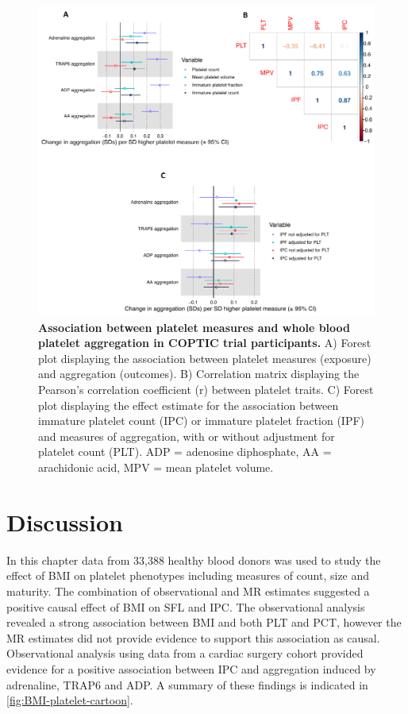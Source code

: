 \documentclass[11pt,twoside]{bristolthesis}
\begin{document}
\begin{figure}

{\centering \includegraphics[width=0.85\linewidth]{figure/BMI_platelets/IPC_aggregation} 

}

\caption[Association between platelet measures and whole blood platelet aggregation in COPTIC trial participants]{\textbf{Association between platelet measures and whole blood platelet aggregation in COPTIC trial participants.} A) Forest plot displaying the association between platelet measures (exposure) and aggregation (outcomes). B) Correlation matrix displaying the Pearson's correlation coefficient (r) between platelet traits. C) Forest plot displaying the effect estimate for the association between immature platelet count (IPC) or immature platelet fraction (IPF) and measures of aggregation, with or without adjustment for platelet count (PLT). ADP = adenosine diphosphate, AA = arachidonic acid, MPV = mean platelet volume.}\label{fig:IPC-aggregation}
\end{figure}
\hypertarget{discussion}{%
\section{Discussion}\label{discussion}}

In this chapter data from 33,388 healthy blood donors was used to study the effect of BMI on platelet phenotypes including measures of count, size and maturity. The combination of observational and MR estimates suggested a positive causal effect of BMI on SFL and IPC. The observational analysis revealed a strong association between BMI and both PLT and PCT, however the MR estimates did not provide evidence to support this association as causal. Observational analysis using data from a cardiac surgery cohort provided evidence for a positive association between IPC and aggregation induced by adrenaline, TRAP6 and ADP. A summary of these findings is indicated in \ref{fig:BMI-platelet-cartoon}.
\end{document}
